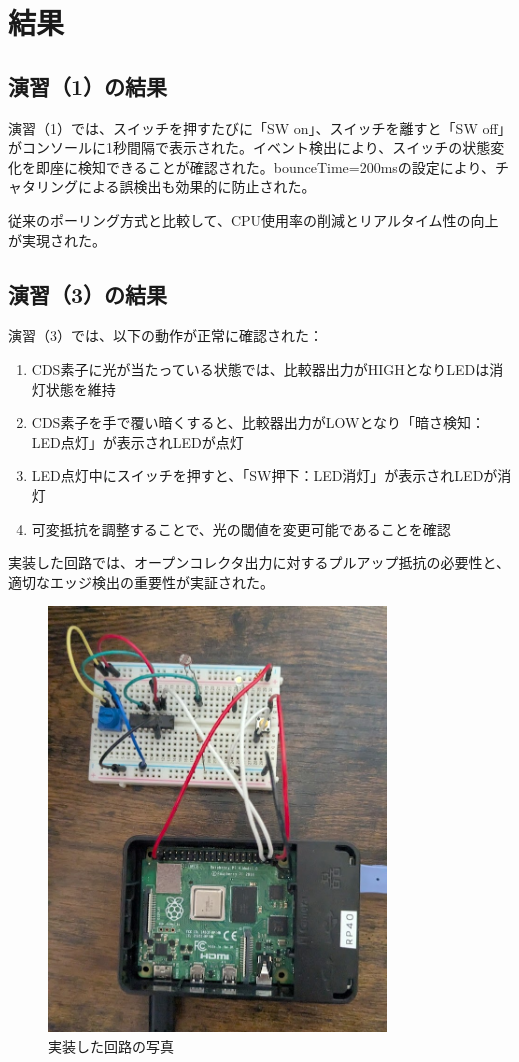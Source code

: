 \documentclass[a4paper,11pt,dvipdfmx]{jsarticle}
\begin{document}
\section{結果}
\subsection{演習（1）の結果}
演習（1）では、スイッチを押すたびに「SW on」、スイッチを離すと「SW off」がコンソールに1秒間隔で表示された。イベント検出により、スイッチの状態変化を即座に検知できることが確認された。bounceTime=200msの設定により、チャタリングによる誤検出も効果的に防止された。

従来のポーリング方式と比較して、CPU使用率の削減とリアルタイム性の向上が実現された。

\subsection{演習（3）の結果}
演習（3）では、以下の動作が正常に確認された：

\begin{enumerate}
\item CDS素子に光が当たっている状態では、比較器出力がHIGHとなりLEDは消灯状態を維持
\item CDS素子を手で覆い暗くすると、比較器出力がLOWとなり「暗さ検知：LED点灯」が表示されLEDが点灯
\item LED点灯中にスイッチを押すと、「SW押下：LED消灯」が表示されLEDが消灯
\item 可変抵抗を調整することで、光の閾値を変更可能であることを確認
\end{enumerate}

実装した回路では、オープンコレクタ出力に対するプルアップ抵抗の必要性と、適切なエッジ検出の重要性が実証された。

\begin{figure}[htbp]
\centering
\includegraphics[width=0.8\textwidth]{image.png}
\caption{実装した回路の写真}
\label{fig:photo}
\end{figure}
\end{document}
